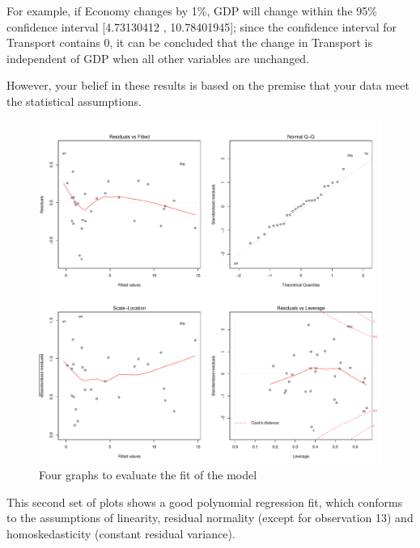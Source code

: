 \documentclass{apmcmthesis}
\begin{document}
For example, if Economy changes by 1\%, GDP will change within the 95\% confidence interval [4.73130412 , 10.78401945]; since the confidence interval for Transport contains 0, it can be concluded that the change in Transport is independent of GDP when all other variables are unchanged. 

However, your belief in these results is based on the premise that your data meet the statistical assumptions.

\begin{figure}[H]
	\centering
	\includegraphics[width=0.7\linewidth]{四幅图_cha}
	\caption{Four graphs to evaluate the fit of the model}
\end{figure}

This second set of plots shows a good polynomial regression fit, which conforms to the assumptions of linearity, residual normality (except for observation 13) and homoskedasticity (constant residual variance).
\end{document}
